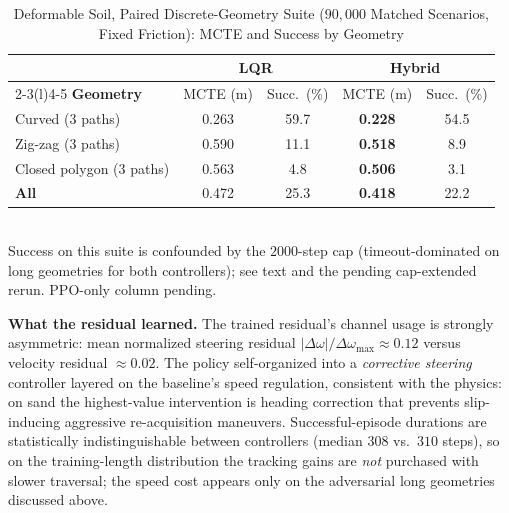 \documentclass[conference]{IEEEtran}
\begin{document}
\begin{table}[t]
\centering
\caption{Deformable Soil, Paired Discrete-Geometry Suite ($90{,}000$ Matched Scenarios, Fixed Friction): MCTE and Success by Geometry}
\label{tab:path_results}
{\footnotesize
\setlength{\tabcolsep}{4pt}
\begin{tabular}{@{}lcccc@{}}
\toprule
& \multicolumn{2}{c}{\textbf{LQR}} & \multicolumn{2}{c}{\textbf{Hybrid}} \\
\cmidrule(lr){2-3}\cmidrule(l){4-5}
\textbf{Geometry} & MCTE (m) & Succ.\ (\%) & MCTE (m) & Succ.\ (\%) \\
\midrule
Curved (3 paths) & 0.263 & 59.7 & \textbf{0.228} & 54.5 \\
Zig-zag (3 paths) & 0.590 & 11.1 & \textbf{0.518} & 8.9 \\
Closed polygon (3 paths) & 0.563 & 4.8 & \textbf{0.506} & 3.1 \\
\midrule
\textbf{All} & 0.472 & 25.3 & \textbf{0.418} & 22.2 \\
\bottomrule
\end{tabular}
}
\\[2pt]
{\footnotesize Success on this suite is confounded by the $2000$-step cap (timeout-dominated on long geometries for both controllers); see text and the pending cap-extended rerun. PPO-only column pending.}
\end{table}

\vspace{1mm}
\noindent\textbf{What the residual learned.} The trained residual's channel usage is strongly asymmetric: mean normalized steering residual $|\Delta\omega|/\Delta\omega_{\max} \approx 0.12$ versus velocity residual $\approx 0.02$. The policy self-organized into a \emph{corrective steering} controller layered on the baseline's speed regulation, consistent with the physics: on sand the highest-value intervention is heading correction that prevents slip-inducing aggressive re-acquisition maneuvers. Successful-episode durations are statistically indistinguishable between controllers (median $308$ vs.\ $310$ steps), so on the training-length distribution the tracking gains are \emph{not} purchased with slower traversal; the speed cost appears only on the adversarial long geometries discussed above.
\end{document}
